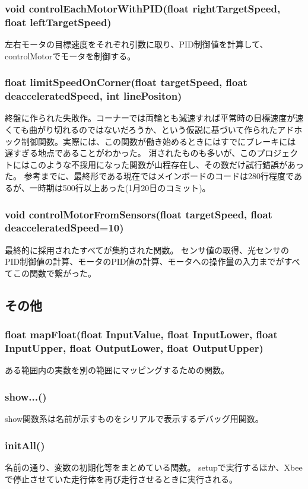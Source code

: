 \documentclass{ltjsreport}
\begin{document}
\subsubsection{void controlEachMotorWithPID(float rightTargetSpeed, float leftTargetSpeed)}
左右モータの目標速度をそれぞれ引数に取り、PID制御値を計算して、controlMotorでモータを制御する。

\subsubsection{float limitSpeedOnCorner(float targetSpeed, float deacceleratedSpeed, int linePositon)}
終盤に作られた失敗作。コーナーでは両輪とも減速すれば平常時の目標速度が速くても曲がり切れるのではないだろうか、という仮説に基づいて作られたアドホック制御関数。実際には、この関数が働き始めるときにはすでにブレーキには遅すぎる地点であることがわかった。
消されたものも多いが、このプロジェクトにはこのような不採用になった関数が山程存在し、その数だけ試行錯誤があった。
参考までに、最終形である現在ではメインボードのコードは280行程度であるが、一時期は500行以上あった(1月20日のコミット)。

\subsubsection{void controlMotorFromSensors(float targetSpeed, float deacceleratedSpeed=10)}
最終的に採用されたすべてが集約された関数。
センサ値の取得、光センサのPID制御値の計算、モータのPID値の計算、モータへの操作量の入力までがすべてこの関数で繋がった。

\subsection{その他}
\subsubsection{float mapFloat(float InputValue, float InputLower, float InputUpper, float OutputLower, float OutputUpper)}
ある範囲内の実数を別の範囲にマッピングするための関数。

\subsubsection{show...()}
show関数系は名前が示すものをシリアルで表示するデバッグ用関数。

\subsubsection{initAll()}
名前の通り、変数の初期化等をまとめている関数。
setupで実行するほか、Xbeeで停止させていた走行体を再び走行させるときに実行される。
\end{document}
